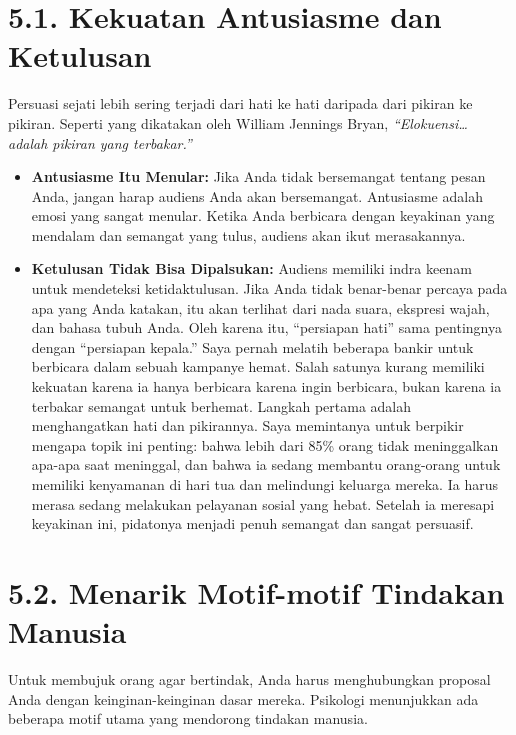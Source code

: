 \documentclass[
  letterpaper,
  DIV=11,
  numbers=noendperiod]{scrreprt}
\begin{document}
\section{\texorpdfstring{\textbf{5.1. Kekuatan Antusiasme dan
Ketulusan}}{5.1. Kekuatan Antusiasme dan Ketulusan}}\label{kekuatan-antusiasme-dan-ketulusan}

Persuasi sejati lebih sering terjadi dari hati ke hati daripada dari
pikiran ke pikiran. Seperti yang dikatakan oleh William Jennings Bryan,
\emph{``Elokuensi\ldots{} adalah pikiran yang terbakar.''}

\begin{itemize}
\item
  \textbf{Antusiasme Itu Menular:} Jika Anda tidak bersemangat tentang
  pesan Anda, jangan harap audiens Anda akan bersemangat. Antusiasme
  adalah emosi yang sangat menular. Ketika Anda berbicara dengan
  keyakinan yang mendalam dan semangat yang tulus, audiens akan ikut
  merasakannya.
\item
  \textbf{Ketulusan Tidak Bisa Dipalsukan:} Audiens memiliki indra
  keenam untuk mendeteksi ketidaktulusan. Jika Anda tidak benar-benar
  percaya pada apa yang Anda katakan, itu akan terlihat dari nada suara,
  ekspresi wajah, dan bahasa tubuh Anda. Oleh karena itu, ``persiapan
  hati'' sama pentingnya dengan ``persiapan kepala.'' Saya pernah
  melatih beberapa bankir untuk berbicara dalam sebuah kampanye hemat.
  Salah satunya kurang memiliki kekuatan karena ia hanya berbicara
  karena ingin berbicara, bukan karena ia terbakar semangat untuk
  berhemat. Langkah pertama adalah menghangatkan hati dan pikirannya.
  Saya memintanya untuk berpikir mengapa topik ini penting: bahwa lebih
  dari 85\% orang tidak meninggalkan apa-apa saat meninggal, dan bahwa
  ia sedang membantu orang-orang untuk memiliki kenyamanan di hari tua
  dan melindungi keluarga mereka. Ia harus merasa sedang melakukan
  pelayanan sosial yang hebat. Setelah ia meresapi keyakinan ini,
  pidatonya menjadi penuh semangat dan sangat persuasif.
\end{itemize}

\section{\texorpdfstring{\textbf{5.2. Menarik Motif-motif Tindakan
Manusia}}{5.2. Menarik Motif-motif Tindakan Manusia}}\label{menarik-motif-motif-tindakan-manusia}

Untuk membujuk orang agar bertindak, Anda harus menghubungkan proposal
Anda dengan keinginan-keinginan dasar mereka. Psikologi menunjukkan ada
beberapa motif utama yang mendorong tindakan manusia.
\end{document}
